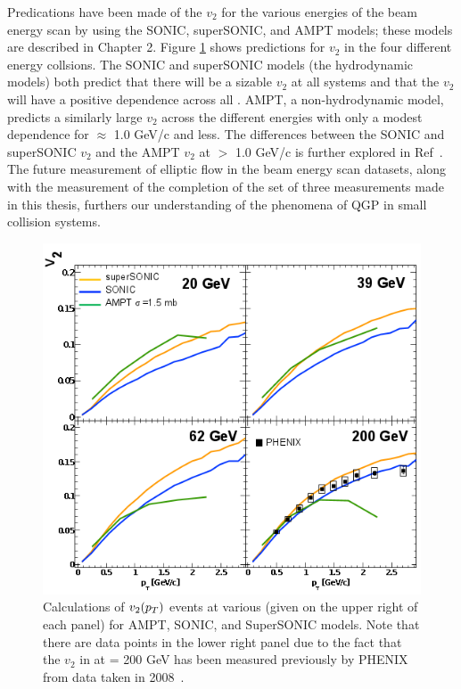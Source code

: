 Predications have been made of the $v_2$ for the various energies of the \dau beam energy scan by using the SONIC, superSONIC, and AMPT models; these models are described in Chapter 2. Figure \ref{fig:dau_bes_predictions} shows predictions for $v_2$ in the four different energy collsions. The SONIC and superSONIC models (the hydrodynamic models) both predict that there will be a sizable $v_2$ at all \sqsn systems and that the $v_2$ will have a positive \sqsn dependence across all \pt. AMPT, a non-hydrodynamic model, predicts a similarly large $v_2$ across the different energies with only a modest \sqsn dependence for \pt $\approx$ 1.0 GeV/c and less. The differences between the SONIC and superSONIC $v_2$ and the AMPT $v_2$ at \pt $>$ 1.0 GeV/c is further explored in Ref~\cite{PhysRevC.93.044910}. The future measurement of elliptic flow in the \dau beam energy scan datasets, along with the measurement of the completion of the set of three measurements made in this thesis, furthers our understanding of the phenomena of QGP in small collision systems.

\begin{figure}[!ht]
\begin{center}
\includegraphics[width=0.75\linewidth]{figs/dau_bescan_theory.png}
\caption{Calculations of $v_2(\mbox{$p_T$})$ \dau events at various \sqsn (given on the upper right of each panel) for AMPT, SONIC, and SuperSONIC models. Note that there are data points in the lower right panel due to the fact that the $v_2$ in \dau at \sqsn = 200 GeV has been measured previously by PHENIX from data taken in 2008~\cite{PhysRevC.93.044910}.}
\label{fig:dau_bes_predictions}
\end{center}
\end{figure}
